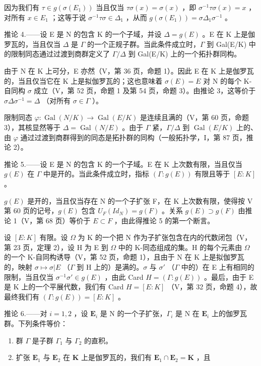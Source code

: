 因为我们有 \(\tau \in g(\sigma(E_1))\) 当且仅当 \(\tau\sigma(x) = \sigma(x)\) ，即 \(\sigma^{-1}\tau\sigma(x) = x\) ，对所有 \(x \in E_1\) ；这等于说 \(\sigma^{-1}\tau\sigma \in \Delta_1\) ，从而 \(g(\sigma(E_1)) = \sigma\Delta_1\sigma^{-1}\) 。

推论 4.——设 E 是 N 的包含 K 的一个子域，并设 \(\Delta = g(E)\) 。E 在 K 上是伽罗瓦的，当且仅当 \(\Delta\) 是 \(\Gamma\) 的一个正规子群。当此条件成立时，\(\Gamma\) 到 Gal(E/K) 中的限制同态通过过渡到商群定义了 \(\Gamma/\Delta\) 到 Gal(E/K) 上的一个拓扑群同构。

由于 N 在 K 上可分，E 亦然（V，第 36 页，命题 1）。因此 E 在 K 上是伽罗瓦的，当且仅当它在 K 上是拟伽罗瓦的；这也意味着 \(\sigma(E) = E\) 对 N 的每个 K-自同构 \(\sigma\) 成立（V，第 52 页，命题 1 及第 54 页，命题 3）。由推论 3，这等价于 \(\sigma\Delta\sigma^{-1} = \Delta\) （对所有 \(\sigma \in \Gamma\) ）。

限制同态 \(\varphi: \operatorname{Gal}(N/K) \to \operatorname{Gal}(E/K)\) 是连续且满的（V，第 60 页，命题 3），其核显然等于 \(\Delta = \operatorname{Gal}(N/E)\) 。由于 \(\Gamma\) 紧，\(\Gamma/\Delta\) 到 \(\operatorname{Gal}(E/K)\) 上的、由 \(\varphi\) 通过过渡到商群得到的同态是拓扑群的同构（一般拓扑学，I，第 87 页，推论 2）。

推论 5.——设 E 是 N 的包含 K 的一个子域。E 在 K 上次数有限，当且仅当 \(g(E)\) 在 \(\Gamma\) 中是开的。当此条件成立时，指标 \((\Gamma:g(E))\) 有限且等于 \([E:K]\) 。

\(g(E)\) 是开的，当且仅当存在 N 的一个子扩张 F，在 K 上次数有限，使得按 V 第 60 页的记号，\(g(E)\) 包含 \(U_{F}(Id_{N}) = g(F)\) 。关系 \(g(E) \supset g(F)\) 由推论 1（V，第 68 页）等价于 \(E \subset F\) ，由此得推论 5 的第一个断言。

设 \([E:K]\) 有限。设 \(\Omega\) 为 K 的一个把 N 作为子扩张包含在内的代数闭包（V，第 23 页，定理 2），设 H 为 E 到 \(\Omega\) 中的 K-同态组成的集。H 的每个元素由 \(\Omega\) 的一个 K-自同构诱导（V，第 52 页，命题 1），且由于 N 在 K 上是拟伽罗瓦的，映射 \(\sigma\mapsto\sigma|E\) （\(\Gamma\) 到 H 上的）是满的。\(\sigma\) 与 \(\sigma'\) （\(\Gamma\) 中的）在 E 上有相同的限制，当且仅当 \(\sigma^{-1}\sigma'\in g(E)\) ，由此 Card \(H=(\Gamma:g(E))\) 。最后，由于 E 是 K 上的一个平展代数，我们有 Card \(H=[E:K]\) （V，第 32 页，命题 4），故最终我们有 \((\Gamma:g(E))=[E:K]\) 。

推论 6.——对 \(i=1,2\) ，设 \(\mathbf{E}_{i}\) 是 N 的一个子扩张，\(\Gamma_{i}\) 是 N 在 \(\mathbf{E}_{i}\) 上的伽罗瓦群。下列条件等价：

\begin{enumerate}
\def\labelenumi{\alph{enumi})}
\item
  群 \(\Gamma\) 是子群 \(\Gamma_1\) 与 \(\Gamma_2\) 的直积。
\item
  扩张 \(\mathbf{E}_1\) 与 \(\mathbf{E}_2\) 在 \(\mathbf{K}\) 上是伽罗瓦的，我们有 \(\mathbf{E}_1 \cap \mathbf{E}_2 = \mathbf{K}\) ，且
\end{enumerate}

